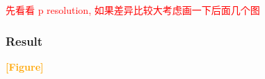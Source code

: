 \documentclass[UTF8]{article}
\newcommand{\red}[1]{\textcolor{red}{#1}}
\newcommand{\figplaceholder}{%
  \begin{center}
    \textcolor{orange}{\Large \textbf{[Figure]}}
  \end{center}%
}
\begin{document}
\red{先看看 p resolution, 如果差异比较大考虑画一下后面几个图}

\subsubsection{Result}

\figplaceholder






\clearpage

\cleardoublepage
{}



\newpage
\end{document}
